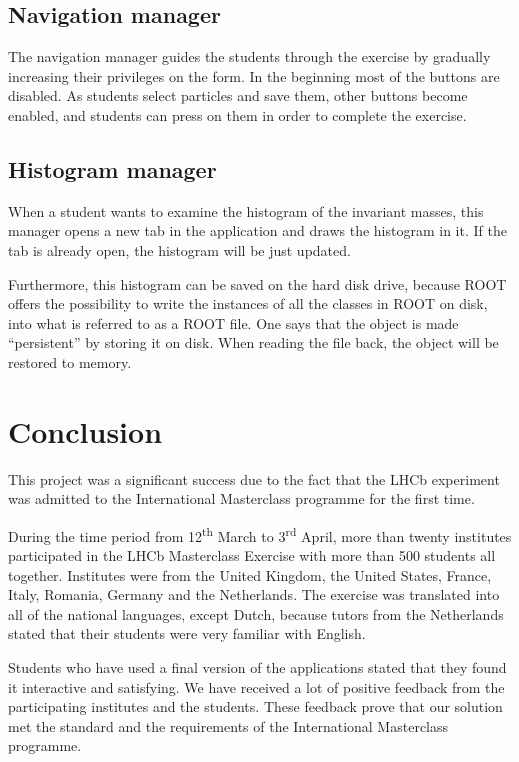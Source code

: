 \documentclass[3p,times,twocolumn]{elsarticle}
\begin{document}
\subsection{Navigation manager}
The navigation manager guides the students through the exercise by gradually increasing their privileges on the form. In the beginning most of the buttons are disabled. As students select particles and save them, other buttons become enabled, and students can press on them in order to complete the exercise. 
\subsection{Histogram manager}
When a student wants to examine the histogram of the invariant masses, this manager opens a new tab in the application and draws the histogram in it. If the tab is already open, the histogram will be just updated. \par
Furthermore, this histogram can be saved on the hard disk drive, because ROOT offers the possibility to write the instances of all the classes in ROOT on disk, into what is referred to as a ROOT file. One says that the object is made ``persistent'' by storing it on disk. When reading the file back, the object will be restored to memory.

\section{Conclusion}
This project was a significant success due to the fact that the LHCb experiment was admitted to the International Masterclass programme for the first time.\par
During the time period from 12\textsuperscript{th} March to 3\textsuperscript{rd} April, more than twenty institutes participated in the LHCb Masterclass Exercise with more than 500 students all together. Institutes were from the United Kingdom, the United States, France, Italy, Romania, Germany and the Netherlands. The exercise was translated into all of the national languages, except Dutch, because tutors from the Netherlands stated that their students were very familiar with English.\par
Students who have used a final version of the applications stated that they found it interactive and satisfying. We have received a lot of positive feedback from the participating institutes and the students. These feedback prove that our solution met the standard and the requirements of the International Masterclass programme. 
\end{document}
